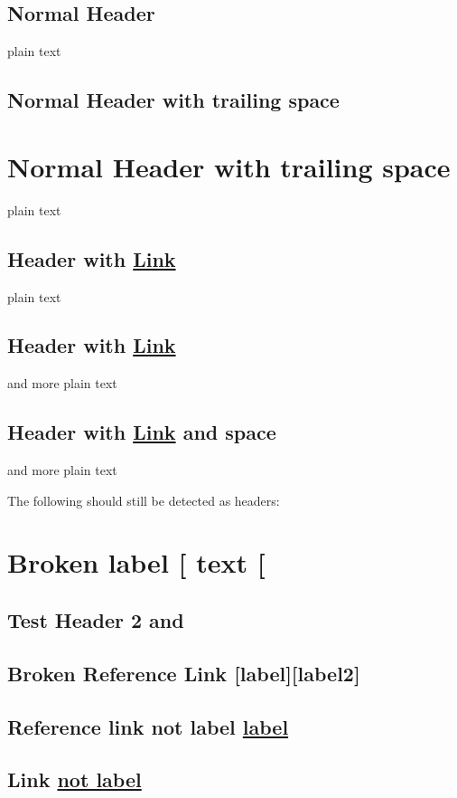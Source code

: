 
\def\mytitle{MultiMarkdown Headers Test}
\def\latexmode{memoir}

\section{Normal Header}
\label{normalheader}

plain text

\section{Normal Header with trailing space}
\label{normalheaderwithtrailingspace}

\chapter{Normal Header with trailing space}
\label{normalheaderwithtrailingspace}

plain text

\section{Header with \href{http://www.google.com}{Link}}
\label{headerwithlink}

plain text

\section{Header with \href{http://www.google.com}{Link}}
\label{headerwithlink}

and more plain text

\section{Header with \href{http://www.google.com}{Link} and space}
\label{headerwithlinkandspace}

and more plain text

The following should still be detected as headers:

\chapter{Broken label [ text [}
\label{brokenlabeltext}

\section{Test Header 2 and}
\label{label}

\section{Broken Reference Link [label][label2]}
\label{brokenreferencelinklabellabel2}

\section{Reference link not label \href{http://example.com/}{label}}
\label{referencelinknotlabellabel}

\section{Link \href{http://example.net/}{not label}}
\label{linknotlabel}




